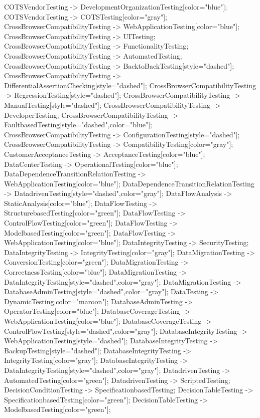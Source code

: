 \documentclass{article}
\begin{document}
{COTSVendorTesting -> DevelopmentOrganizationTesting[color="blue"];
COTSVendorTesting -> COTSTesting[color="gray"];
CrossBrowserCompatibilityTesting -> WebApplicationTesting[color="blue"];
CrossBrowserCompatibilityTesting -> UITesting;
CrossBrowserCompatibilityTesting -> FunctionalityTesting;
CrossBrowserCompatibilityTesting -> AutomatedTesting;
CrossBrowserCompatibilityTesting -> BacktoBackTesting[style="dashed"];
CrossBrowserCompatibilityTesting -> DifferentialAssertionChecking[style="dashed"];
CrossBrowserCompatibilityTesting -> RegressionTesting[style="dashed"];
CrossBrowserCompatibilityTesting -> ManualTesting[style="dashed"];
CrossBrowserCompatibilityTesting -> DeveloperTesting;
CrossBrowserCompatibilityTesting -> FaultbasedTesting[style="dashed",color="blue"];
CrossBrowserCompatibilityTesting -> ConfigurationTesting[style="dashed"];
CrossBrowserCompatibilityTesting -> CompatibilityTesting[color="gray"];
CustomerAcceptanceTesting -> AcceptanceTesting[color="blue"];
DataCenterTesting -> OperationalTesting[color="blue"];
DataDependenceTransitionRelationTesting -> WebApplicationTesting[color="blue"];
DataDependenceTransitionRelationTesting -> DatadrivenTesting[style="dashed",color="gray"];
DataFlowAnalysis -> StaticAnalysis[color="blue"];
DataFlowTesting -> StructurebasedTesting[color="green"];
DataFlowTesting -> ControlFlowTesting[color="green"];
DataFlowTesting -> ModelbasedTesting[color="green"];
DataFlowTesting -> WebApplicationTesting[color="blue"];
DataIntegrityTesting -> SecurityTesting;
DataIntegrityTesting -> IntegrityTesting[color="gray"];
DataMigrationTesting -> ConversionTesting[color="green"];
DataMigrationTesting -> CorrectnessTesting[color="blue"];
DataMigrationTesting -> DataIntegrityTesting[style="dashed",color="gray"];
DataMigrationTesting -> DatabaseAdminTesting[style="dashed",color="gray"];
DataTesting -> DynamicTesting[color="maroon"];
DatabaseAdminTesting -> OperatorTesting[color="blue"];
DatabaseCoverageTesting -> WebApplicationTesting[color="blue"];
DatabaseCoverageTesting -> ControlFlowTesting[style="dashed",color="gray"];
DatabaseIntegrityTesting -> WebApplicationTesting[style="dashed"];
DatabaseIntegrityTesting -> BackupTesting[style="dashed"];
DatabaseIntegrityTesting -> IntegrityTesting[color="gray"];
DatabaseIntegrityTesting -> DataIntegrityTesting[style="dashed",color="gray"];
DatadrivenTesting -> AutomatedTesting[color="green"];
DatadrivenTesting -> ScriptedTesting;
DecisionConditionTesting -> SpecificationbasedTesting;
DecisionTableTesting -> SpecificationbasedTesting[color="green"];
DecisionTableTesting -> ModelbasedTesting[color="green"];
}
\end{document}
